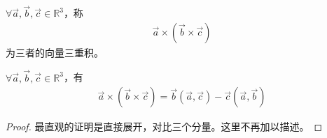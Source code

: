 \begin{definition}
  $\forall \vec a,\vec b,\vec c\in\mathbb{R}^3$，称
  \begin{align*}
    \vec a\times(\vec b\times \vec c)
  \end{align*}
  为三者的向量三重积。
\end{definition}

\begin{lemma}
  $\forall \vec a,\vec b,\vec c\in\mathbb{R}^3$，有
  \begin{align*}
    \vec a\times(\vec b\times \vec c)=\vec b(\vec a,\vec c) - \vec c(\vec a,\vec b)
  \end{align*}
\end{lemma}
\begin{proof}
  最直观的证明是直接展开，对比三个分量。这里不再加以描述。


\end{proof}
